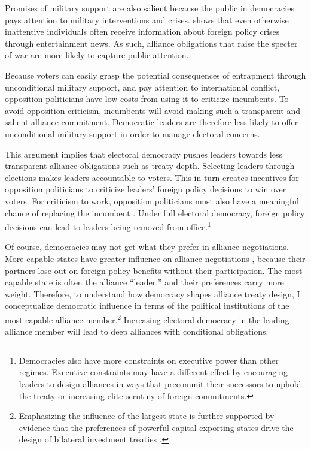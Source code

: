 \documentclass[12pt]{article}
\begin{document}
Promises of military support are also salient because the public in democracies pays attention to military interventions and crises. 
\citet{Baum2002} shows that even otherwise inattentive individuals often receive information about foreign policy crises through entertainment news. 
As such, alliance obligations that raise the specter of war are more likely to capture public attention. 


Because voters can easily grasp the potential consequences of entrapment through unconditional military support, and pay attention to international conflict, opposition politicians have low costs from using it to criticize incumbents. 
To avoid opposition criticism, incumbents will avoid making such a transparent and salient alliance commitment.
Democratic leaders are therefore less likely to offer unconditional military support in order to manage electoral concerns. 


This argument implies that electoral democracy pushes leaders towards less transparent alliance obligations such as treaty depth.
Selecting leaders through elections makes leaders accountable to voters. 
This in turn creates incentives for opposition politicians to criticize leaders' foreign policy decisions to win over voters. 
For criticism to work, opposition politicians must also have a meaningful chance of replacing the incumbent \citep{HydeMarinov2012}.
Under full electoral democracy, foreign policy decisions can lead to leaders being removed from office.\footnote{Democracies also have more constraints on executive power than other regimes. Executive constraints may have a different effect by encouraging leaders to design alliances in ways that precommit their successors to uphold the treaty or increasing elite scrutiny of foreign commitments.} 


Of course, democracies may not get what they prefer in alliance negotiations. 
More capable states have greater influence on alliance negotiations \citep{Mattes2012}, because their partners lose out on foreign policy benefits without their participation.
The most capable state is often the alliance ``leader,'' and their preferences carry more weight. 
Therefore, to understand how democracy shapes alliance treaty design, I conceptualize democratic influence in terms of the political institutions of the most capable alliance member.\footnote{Emphasizing the influence of the largest state is further supported by evidence that the preferences of powerful capital-exporting states drive the design of bilateral investment treaties \citep{AlleePeinhardt2014}.} 
Increasing electoral democracy in the leading alliance member will lead to deep alliances with conditional obligations. 
\end{document}
